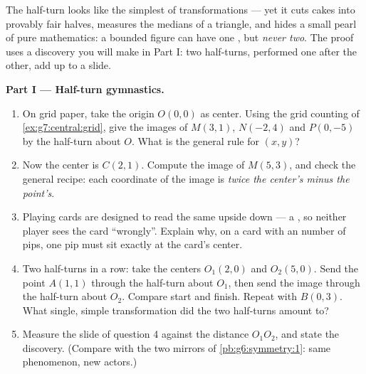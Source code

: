 \begin{problem}
\label{pb:g7:central:1}
The half-turn looks like the simplest of transformations --- yet
it cuts cakes into provably fair halves, measures the medians of
a triangle, and hides a small pearl of pure mathematics: a
bounded figure can have one , but \emph{never
two}. The proof uses a discovery you will make in Part I: two
half-turns, performed one after the other, add up to a slide.

\medskip
\noindent\textbf{Part I --- Half-turn gymnastics.}
\begin{enumerate}
  \item On grid paper, take the origin $O(0, 0)$ as center.
        Using the grid counting of \cref{ex:g7:central:grid},
        give the images of $M(3, 1)$, $N(-2, 4)$ and
        $P(0, -5)$ by the half-turn about $O$. What is the
        general rule for $(x, y)$?
  \item Now the center is $C(2, 1)$. Compute the image of
        $M(5, 3)$, and check the general recipe: each coordinate
        of the image is \emph{twice the center's minus the
        point's}.
  \item Playing cards are designed to read the same upside down
        --- a , so neither player sees the card
        ``wrongly''. Explain why, on a card with an \emph{}
        number of pips, one pip must sit exactly at the card's
        center.
  \item Two half-turns in a row: take the centers $O_1(2, 0)$
        and $O_2(5, 0)$. Send the point $A(1, 1)$ through the
        half-turn about $O_1$, then send the image through the
        half-turn about $O_2$. Compare start and finish. Repeat
        with $B(0, 3)$. What single, simple transformation did
        the two half-turns amount to?
  \item Measure the slide of question 4 against the distance
        $O_1 O_2$, and state the discovery. (Compare with the
        two  mirrors of \cref{pb:g6:symmetry:1}: same
        phenomenon, new actors.)
\end{enumerate}


\end{problem}
